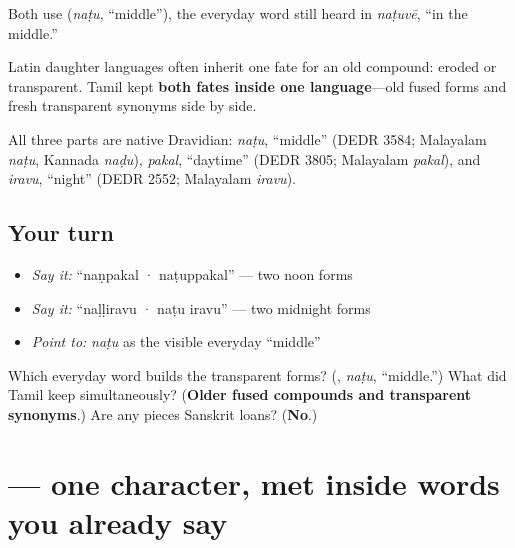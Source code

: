 Both use \textbf{} (\emph{naṭu}, \textquotedblleft{}middle\textquotedblright{}), the everyday word still heard in \emph{naṭuvē}, \textquotedblleft{}in the middle.\textquotedblright{}

Latin daughter languages often inherit one fate for an old compound: eroded or transparent. Tamil kept \textbf{both fates inside one language}—old fused forms and fresh transparent synonyms side by side.

\begin{cousinweb}
All three parts are native Dravidian: \emph{naṭu}, \textquotedblleft{}middle\textquotedblright{} (DEDR 3584; Malayalam \emph{naṭu}, Kannada \emph{naḍu}), \emph{pakal}, \textquotedblleft{}daytime\textquotedblright{} (DEDR 3805; Malayalam \emph{pakal}), and \emph{iravu}, \textquotedblleft{}night\textquotedblright{} (DEDR 2552; Malayalam \emph{iravu}).
\end{cousinweb}

\subsection*{Your turn}
\begin{itemize}
\raggedright
  \item \emph{Say it:} \textquotedblleft{}naṇpakal · naṭuppakal\textquotedblright{} — two noon forms
  \item \emph{Say it:} \textquotedblleft{}naḷḷiravu · naṭu iravu\textquotedblright{} — two midnight forms
  \item \emph{Point to:} \emph{naṭu} as the visible everyday \textquotedblleft{}middle\textquotedblright{}
\end{itemize}

\begin{tcolorbox}[breakable,colback=teal!4,colframe=teal!35!black,title={Before you move on}]
Which everyday word builds the transparent forms? (\textbf{}, \emph{naṭu}, \textquotedblleft{}middle.\textquotedblright{}) What did Tamil keep simultaneously? (\textbf{Older fused compounds and transparent synonyms}.) Are any pieces Sanskrit loans? (\textbf{No}.)
\end{tcolorbox}
\section[\texorpdfstring{\ta{ு} (u)}{ு (u)}]{ — one character, met inside words you already say}

\label{lesson:TA-S121-vowel-sign-u}



